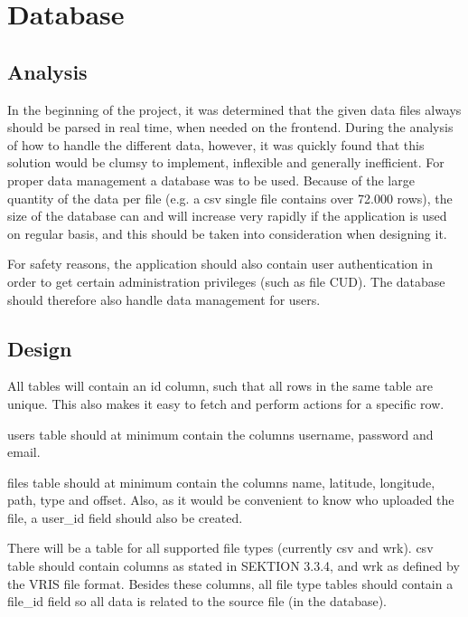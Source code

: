 \section{Database}

\subsection{Analysis}
In the beginning of the project, it was determined that the given data files always should be parsed in real time, when needed on the frontend. During the analysis of how to handle the different data, however, it was quickly found that this solution would be clumsy to implement, inflexible and generally inefficient.
For proper data management a database was to be used. Because of the large quantity of the data per file (e.g. a csv single file contains over 72.000 rows), the size of the database can and will increase very rapidly if the application is used on regular basis, and this should be taken into consideration when designing it.

For safety reasons, the application should also contain user authentication in order to get certain administration privileges (such as file CUD). The database should therefore also handle data management for users.

\subsection{Design}
All tables will contain an \textsf{id} column, such that all rows in the same table are unique. This also makes it easy to fetch and perform actions for a specific row.

\textsf{users} table should at minimum contain the columns \textsf{username, password} and \textsf{email}.

\textsf{files} table should at minimum contain the columns \textsf{name, latitude, longitude, path, type} and \textsf{offset}.
Also, as it would be convenient to know who uploaded the file, a \textsf{user\_id} field should also be created.

There will be a table for all supported file types (currently \textsf{csv} and \textsf{wrk}). \textsf{csv} table should contain columns as stated in SEKTION 3.3.4, and \textsf{wrk} as defined by the VRIS file format. Besides these columns, all file type tables should contain a \textsf{file\_id} field so all data is related to the source file (in the database).

